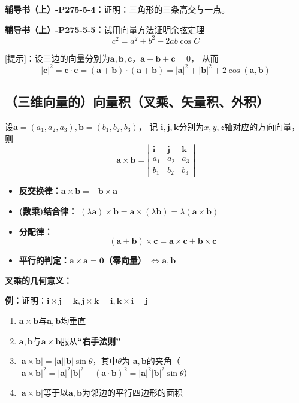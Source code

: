 {\bf 辅导书（上）-P275-5-4：}证明：三角形的三条高交与一点。

{\bf 辅导书（上）-P275-5-5：}试用向量方法证明余弦定理
$$c^2=a^2+b^2-2ab\cos C$$

[提示]：设三边的向量分别为$\bm{a},\bm{b},\bm{c}$，$\bm{a}+\bm{b}+\bm{c}=0$，
从而
$$|\bm{c}|^2=\bm{c}\cdot\bm{c}=(\bm{a}+\bm{b})\cdot(\bm{a}+\bm{b})
=|\bm{a}|^2+|\bm{b}|^2+2\cos(\bm{a},\bm{b})$$

\subsection{（三维向量的）向量积（叉乘、矢量积、外积）}

设$\bm{a}=(a_1,a_2,a_3),\bm{b}=(b_1,b_2,b_3)$， 记
$\bm{i},\bm{j},\bm{k}$分别为$x,y,z$轴对应的方向向量， 则
$$\bm{a}\times\bm{b}=\left|\begin{array}{ccc}
\bm{i} & \bm{j} & \bm{k}\\
a_1 & a_2 & a_3\\
b_1 & b_2 & b_3
\end{array}\right|$$

\begin{itemize}
  \item {\bf 反交换律：}$\bm{a}\times\bm{b}=-\bm{b}\times\bm{a}$
  \item {\bf (数乘)结合律：}
  $(\lambda\bm{a})\times\bm{b}=\bm{a}\times(\lambda\bm{b})
  =\lambda(\bm{a}\times\bm{b})$
  \item {\bf 分配律：}
  $$(\bm{a}+\bm{b})\times\bm{c}=\bm{a}\times\bm{c}+\bm{b}\times\bm{c}$$
  \item {\bf 平行的判定：}$\bm{a}\times\bm{a}=\bm{0}${\bf （零向量）}
  $\Leftrightarrow\bm{a},\bm{b}$
\end{itemize}

{\bf 叉乘的几何意义：}

{\bf 例：}证明：$\bm{i}\times\bm{j}=\bm{k},\bm{j}\times\bm{k}=\bm{i},
\bm{k}\times\bm{i}=\bm{j}$

\begin{enumerate}[(1)]
  \setlength{\itemindent}{1cm}
  \item $\bm{a}\times\bm{b}$与$\bm{a},\bm{b}$均垂直
  \item $\bm{a},\bm{b}$与$\bm{a}\times\bm{b}$服从{\bf “右手法则”}
  \item $|\bm{a}\times\bm{b}|=|\bm{a}||\bm{b}|\sin\theta$，其中$\theta$为
  $\bm{a},\bm{b}$的夹角（$|\bm{a}\times\bm{b}|^2=|\bm{a}|^2|\bm{b}|^2-
  (\bm{a}\cdot\bm{b})^2=|\bm{a}|^2|\bm{b}|^2\sin\theta$）
  \item $|\bm{a}\times\bm{b}|$等于以$\bm{a},\bm{b}$为邻边的平行四边形的面积
\end{enumerate}

